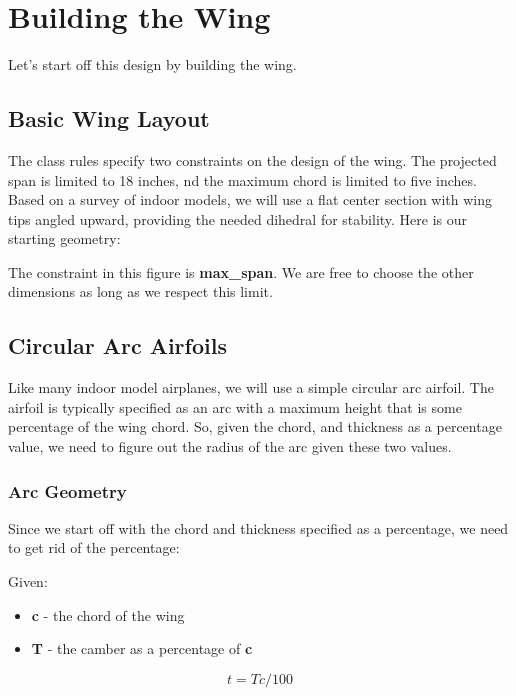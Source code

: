 \section{Building the Wing}

Let's start off this design by building the wing.

\subsection*{Basic Wing Layout}

The class rules specify two constraints on the design of the wing. The
projected span is limited to 18 inches, nd the maximum chord is limited to five
inches. Based on a survey of indoor models, we will use a flat center section
with wing tips angled upward, providing the needed dihedral for stability. Here
is our starting geometry:



The constraint in this figure is {\bf max\_span}. We are free to choose the
other dimensions as long as we respect this limit.

\subsection{Circular Arc Airfoils}

Like many indoor model airplanes, we will use a simple circular arc airfoil.
The airfoil is typically specified as an arc with a maximum height that is some
percentage of the wing chord.  So, given the chord, and thickness as a
percentage value, we need to figure out the radius of the arc given these two
values.

\subsubsection{Arc Geometry}

Since we start off with the chord and thickness specified as a percentage, we
need to get rid of the percentage:

Given:

\begin{itemize}
  \item{{\bf c} - the chord of the wing}
  \item{{\bf T} - the camber as a percentage of {\bf c}}
\end{itemize}

\begin{equation}
    t =  T c / 100
\end{equation}

